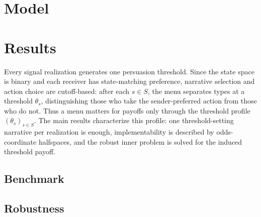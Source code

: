 \documentclass[12pt]{article}
\theoremstyle{break}
\begin{document}
\section{Model}
\label{sec:model}



\section{Results}
\label{sec:results}
Every signal realization generates one persuasion threshold. Since the state space is binary and each receiver has state-matching preference, narrative selection and action choice are cutoff-based: after each $s\in S$, the menu separates types at a threshold $\theta_s$, distinguishing those who take the sender-preferred action from those who do not. Thus a menu matters for payoffs only through the threshold profile $(\theta_s)_{s\in S}$. The main results characterize this profile: one threshold-setting narrative per realization is enough, implementability is described by odds-coordinate halfspaces, and the robust inner problem is solved for the induced threshold payoff.

\subsection{Benchmark}
\label{sec:benchmark}

\subsection{Robustness}
\label{sec:robustness}

%
\end{document}
